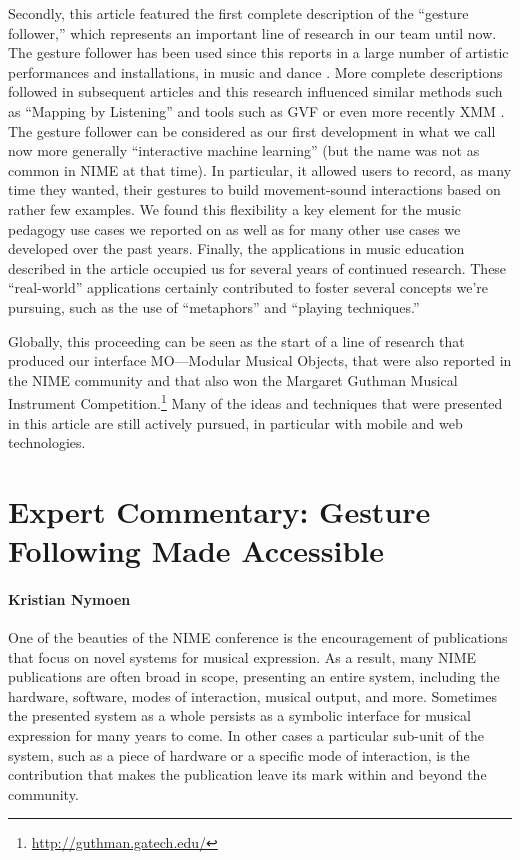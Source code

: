 Secondly, this article featured the first complete description of the ``gesture follower,'' which represents an important line of research in our team until now. The gesture follower has been used since this reports in a large number of artistic performances and installations, in music and dance \cite{Bevilacqua:2011}. More complete descriptions followed in subsequent articles and this research influenced similar methods such as ``Mapping by Listening'' and tools such as GVF \cite{Caramiaux:2014} or even more recently XMM \cite{Francoise:2014}. The gesture follower can be considered as our first development in what we call now more generally ``interactive machine learning'' (but the name was not as common in NIME at that time). In particular, it allowed users to record, as many time they wanted, their gestures to build movement-sound interactions based on rather few examples. We found this flexibility a key element for the music pedagogy use cases we reported on as well as for many other use cases we developed over the past years.
Finally, the applications in music education described in the article occupied us for several years of continued research. These ``real-world'' applications certainly contributed to foster several concepts we're pursuing, such as the use of ``metaphors'' and ``playing techniques.''

Globally, this proceeding can be seen as the start of a line of research that produced our interface MO---Modular Musical Objects, that were also reported in the NIME community \cite{Schnell:2011} and that also won the Margaret Guthman Musical Instrument Competition.\footnote{\url{http://guthman.gatech.edu/}} Many of the ideas and techniques that were presented in this article are still actively pursued, in particular with mobile and web technologies.


\section*{Expert Commentary: Gesture Following Made Accessible}

\paragraph{Kristian Nymoen}

One of the beauties of the NIME conference is the encouragement of publications that focus on novel systems for musical expression. As a result, many NIME publications are often broad in scope, presenting an entire system, including the hardware, software, modes of interaction, musical output, and more. Sometimes the presented system as a whole persists as a symbolic interface for musical expression for many years to come. In other cases a particular sub-unit of the system, such as a piece of hardware or a specific mode of interaction, is the contribution that makes the publication leave its mark within and beyond the community. 

